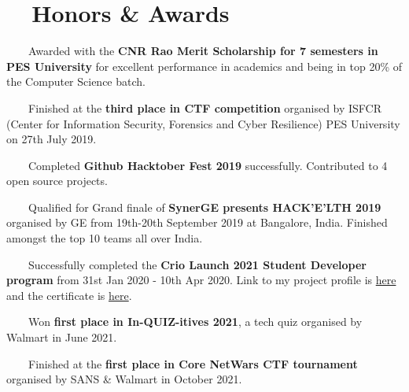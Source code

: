 \documentclass[a4paper,20pt]{article}
\begin{document}
\section{~~Honors \& Awards}
  \begin{description}[font=$\bullet$]
    \item{~~~~Awarded with the \textbf{CNR Rao Merit Scholarship for 7 semesters in PES University} for excellent performance in academics and being in top 20\% of the Computer Science batch.}
    \vspace{-5pt}
    \item {~~~~Finished at the \textbf{third place in CTF competition} organised by ISFCR (Center for Information Security, Forensics and Cyber Resilience) PES University on 27th July 2019.}
    \vspace{-5pt}
    \item {~~~~Completed \textbf{Github Hacktober Fest 2019} successfully. Contributed to 4 open source projects.}
    \vspace{-5pt}
    \item {~~~~Qualified for Grand finale of \textbf{SynerGE presents HACK'E'LTH 2019} organised by GE from 19th-20th September 2019 at Bangalore, India. Finished amongst the top 10 teams all over India.}
    \vspace{-5pt}
    \item {~~~~Successfully completed the \textbf{Crio Launch 2021 Student Developer program} from 31st Jan 2020 - 10th Apr 2020. Link to my project profile is {\color{blue}\href{https://criodo.github.io/Crio-Launch-Feb-2020-jai-bhageria/}{here}} and the certificate is {\color{blue}\href{https://raw.githubusercontent.com/CrioDo/Crio-Launch-Feb-2020-jai-bhageria/gh-pages/static/media/Crio-Launch-Feb-2020-Certificate.png}{here}}.}
    \vspace{-5pt}
    \item {~~~~Won \textbf{first place in In-QUIZ-itives 2021}, a tech quiz organised by Walmart in June 2021.}
    \vspace{-5pt}
    \item {~~~~Finished at the \textbf{first place in Core NetWars CTF tournament} organised by SANS \& Walmart in October 2021.}
  \end{description}
\end{document}
